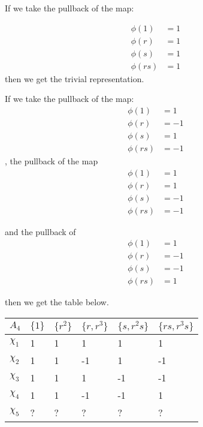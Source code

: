 \documentclass[]{article}
\begin{document}
If we take the pullback of the map:

\begin{align*}
	\phi(1) &= 1\\
	\phi(r) &= 1\\
	\phi(s) &= 1\\
	\phi(rs) &= 1
\end{align*}
then we get the trivial representation.

If we take the pullback of the map:
\begin{align*}
	\phi(1) &= 1\\
	\phi(r) &= -1\\
	\phi(s) &= 1\\
	\phi(rs) &= -1
\end{align*},
the pullback of the map
\begin{align*}
	\phi(1) &= 1\\
	\phi(r) &= 1\\
	\phi(s) &= -1\\
	\phi(rs) &= -1
\end{align*}

and the pullback of
\begin{align*}
	\phi(1) &= 1\\
	\phi(r) &= -1\\
	\phi(s) &= -1\\
	\phi(rs) &= 1
\end{align*}

then we get the table below.
\begin{table}[]
	\centering
	\begin{tabular}{|l|l|l|l|l|l|}
		\hline
		$A_4$    & $\{ 1 \} $ & $\{ r^2 \}$ & $ \{ r, r^3 \}$ & $\{ s, r^2 s \}$ & $\{ rs, r^3 s\}$ \\ \hline
		$\chi_1$ & 1          & 1           & 1               & 1                & 1                \\ \hline
		$\chi_2$ & 1          & 1           & -1              & 1                & -1               \\ \hline
		$\chi_3$ & 1          & 1           & 1               & -1               & -1               \\ \hline
		$\chi_4$ & 1          & 1           & -1              & -1               & 1                \\ \hline
		$\chi_5$ & ?          & ?           & ?               & ?                & ?                \\ \hline
	\end{tabular}
\end{table}
\end{document}
